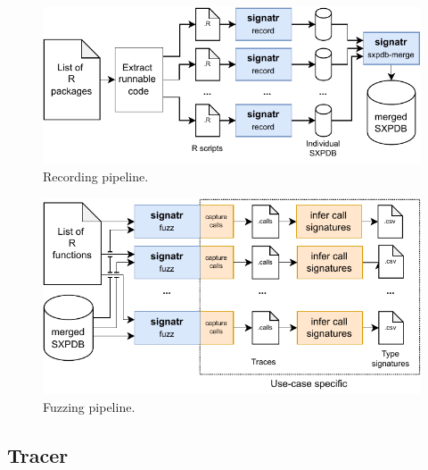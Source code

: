 \documentclass[sigplan,anonymous,review]{acmart}
\begin{document}
\begin{figure}
    \centering
    \includegraphics[width=\columnwidth]{code-and-figures/sxdb-pipeline.pdf}
    \caption{
    Recording pipeline.
    }\label{fig:sxpdb-pipeline}
\end{figure}

\begin{figure}
    \centering
    \includegraphics[width=\columnwidth]{code-and-figures/fuzz-pipeline.pdf}
    \caption{
    Fuzzing pipeline.
    }\label{fig:fuzz-pipeline}
\end{figure}

\subsection{Tracer}\label{sec:argtracer}
\end{document}
